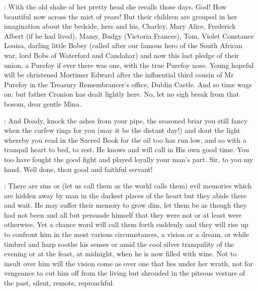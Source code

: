 \documentclass[12pt]{article}
\begin{document}
: With the old shake of her pretty head she recalls those days. God!
How beautiful now across the mist of years! But their children are
grouped in her imagination about the bedside, hers and his, Charley, Mary
Alice, Frederick Albert (if he had lived), Mamy, Budgy (Victoria
Frances), Tom, Violet Constance Louisa, darling little Bobsy (called
after our famous hero of the South African war, lord Bobs of Waterford
and Candahar) and now this last pledge of their union, a Purefoy if ever
there was one, with the true Purefoy nose. Young hopeful will be
christened Mortimer Edward after the influential third cousin of Mr
Purefoy in the Treasury Remembrancer's office, Dublin Castle. And so time
wags on: but father Cronion has dealt lightly here. No, let no sigh break
from that bosom, dear gentle Mina.

: And Doady, knock the ashes from your pipe, the seasoned briar you
still fancy when the curfew rings for you (may it be the distant day!) and
dout the light whereby you read in the Sacred Book for the oil too has run
low, and so with a tranquil heart to bed, to rest. He knows and will call
in His own good time. You too have fought the good fight and played
loyally your man's part. Sir, to you my hand. Well done, thou good and
faithful servant!


: There are sins or (let us call them as the world calls them) evil
memories which are hidden away by man in the darkest places of the heart
but they abide there and wait. He may suffer their memory to grow dim,
let them be as though they had not been and all but persuade himself that
they were not or at least were otherwise. Yet a chance word will call
them forth suddenly and they will rise up to confront him in the most
various circumstances, a vision or a dream, or while timbrel and harp
soothe his senses or amid the cool silver tranquility of the evening or
at the feast, at midnight, when he is now filled with wine. Not to insult
over him will the vision come as over one that lies under her wrath, not
for vengeance to cut him off from the living but shrouded in the piteous
vesture of the past, silent, remote, reproachful.

\end{document}
